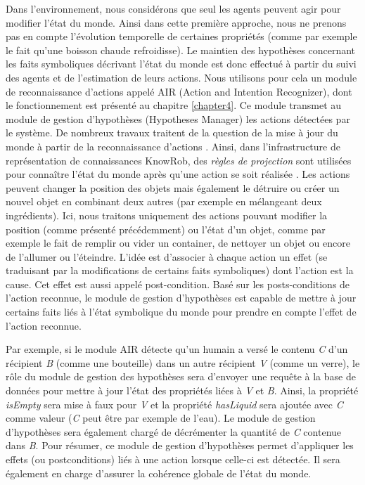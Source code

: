 \documentclass[a4paper,11pt,twoside]{StyleThese}
\begin{document}
Dans l'environnement, nous considérons que seul les agents peuvent agir pour modifier l'état du monde. Ainsi dans cette première approche, nous ne prenons pas en compte l'évolution temporelle de certaines propriétés (comme par exemple le fait qu'une boisson chaude refroidisse).
Le maintien des hypothèses concernant les faits symboliques décrivant l'état du monde est donc effectué à partir du suivi des agents et de l'estimation de leurs actions. Nous utilisons pour cela un module de reconnaissance d'actions appelé AIR (Action and Intention Recognizer), dont le fonctionnement est présenté au chapitre \ref{chapter4}.
Ce module transmet au module de gestion d'hypothèses (Hypotheses Manager) les actions détectées par le système.
De nombreux travaux traitent de la question de la mise à jour du monde à partir de la reconnaissance d'actions \cite{ginsberg1988reasoning,ginsberg1988reasoning2,rao1989minimal,jackson1990semantic,brewka1993things}.
Ainsi, dans l'infrastructure de représentation de connaissances KnowRob, des \textit{règles de projection} sont utilisées pour connaître l'état du monde après qu'une action se soit réalisée \cite{tenorth2015representations}. Les actions peuvent changer la position des objets mais également le détruire ou créer un nouvel objet en combinant deux autres (par exemple en mélangeant deux ingrédients). Ici, nous traitons uniquement des actions pouvant modifier la position (comme présenté précédemment) ou l'état d'un objet, comme par exemple le fait de remplir ou vider un container, de nettoyer un objet ou encore de l'allumer ou l'éteindre. L'idée est d'associer à chaque action un effet (se traduisant par la modifications de certains faits symboliques) dont l'action est la cause. Cet effet est aussi appelé post-condition. Basé sur les posts-conditions de l'action reconnue, le module de gestion d'hypothèses est capable de mettre à jour certains faits liés à l'état symbolique du monde pour prendre en compte l'effet de l'action reconnue.

Par exemple, si le module AIR détecte qu'un humain a versé le contenu \textit{C} d'un récipient \textit{B} (comme une bouteille) dans un autre récipient \textit{V} (comme un verre), le rôle du module de gestion des hypothèses sera d'envoyer une requête à la base de données pour mettre à jour l'état des propriétés liées à \textit{V} et \textit{B}. Ainsi, la propriété \textit{isEmpty} sera mise à faux pour \textit{V} et la propriété \textit{hasLiquid} sera ajoutée avec \textit{C} comme valeur (\textit{C} peut être par exemple de l'eau). Le module de gestion d'hypothèses sera également chargé de décrémenter la quantité de \textit{C} contenue dans \textit{B}.
Pour résumer, ce module de gestion d'hypothèses permet d'appliquer les effets (ou postconditions) liés à une action lorsque celle-ci est détectée. Il sera également en charge d'assurer la cohérence globale de l'état du monde.
\end{document}
